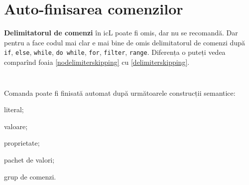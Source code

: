 \section{Auto-finisarea comenzilor}

\textbf{Delimitatorul de comenzi} în icL poate fi omis, dar nu se recomandă. Dar pentru a face codul mai clar e mai bine de omis delimitatorul de comenzi după \texttt{if}, \texttt{else}, \texttt{while}, \texttt{do while}, \texttt{for}, \texttt{filter}, \texttt{range}. Diferența o puteți vedea comparînd foaia \ref{nodelimiterskipping} cu  \ref{delimiterskipping}.

\begin{sourcecode}
\label{nodelimiterskipping}
\inputminted[linenos]{icl}{../sources/nodelimiterskipping.icL}
\end{sourcecode}

\begin{sourcecode}
\label{delimiterskipping}
\inputminted[linenos]{icl}{../sources/delimiterskipping.icL}
\end{sourcecode}

Comanda poate fi finisată automat după următoarele construcții semantice:
\begin{icItems}
	\item literal;
	\item valoare;
	\item proprietate;
	\item pachet de valori;
	\item grup de comenzi.
\end{icItems}
